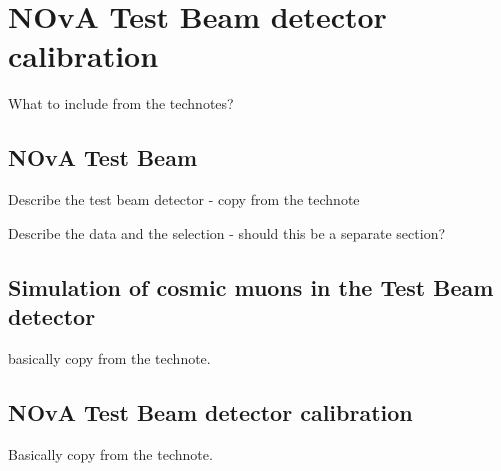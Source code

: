 \chapter{NOvA Test Beam detector calibration}\label{sec:TestBeamCalibration}

What to include from the technotes?

\section{NOvA Test Beam}
Describe the test beam detector - copy from the technote

Describe the data and the selection - should this be a separate section?

\section{Simulation of cosmic muons in the Test Beam detector}
basically copy from the technote.

\section{NOvA Test Beam detector calibration}
Basically copy from the technote.